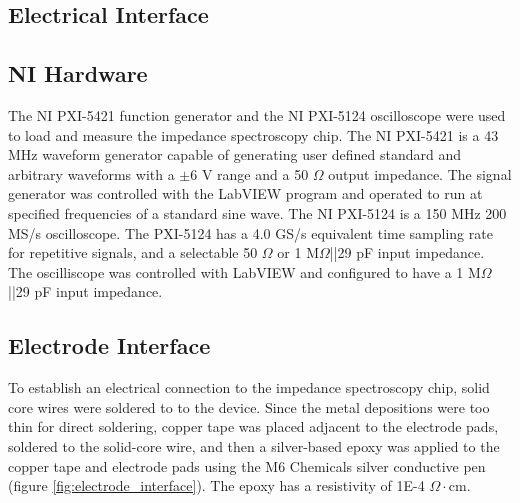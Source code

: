 \subsection{Electrical Interface}

\subsection*{NI Hardware}
\par The NI PXI-5421 function generator and the NI PXI-5124 oscilloscope were used to load and measure the impedance spectroscopy chip. The NI PXI-5421 is a 43 MHz waveform generator capable of generating user defined standard and arbitrary waveforms with a $\pm$6 V range and a 50 $\Omega$ output impedance. The signal generator was controlled with the LabVIEW program and operated to run at specified frequencies of a standard sine wave. The NI PXI-5124 is a 150 MHz 200 MS/s oscilloscope. The PXI-5124 has a 4.0 GS/s equivalent time sampling rate for repetitive signals, and a selectable 50 $\Omega$ or 1 M$\Omega$||29 pF input impedance. The oscilliscope was controlled with LabVIEW and configured to have a 1 M$\Omega$||29 pF input impedance.

\subsection*{Electrode Interface}
\par To establish an electrical connection to the impedance spectroscopy chip, solid core wires were soldered to to the device. Since the metal depositions were too thin for direct soldering, copper tape was placed adjacent to the electrode pads, soldered to the solid-core wire, and then a silver-based epoxy was applied to the copper tape and electrode pads using the M6 Chemicals silver conductive pen (figure \ref{fig:electrode_interface}). The epoxy has a resistivity of 1E-4 $\Omega\cdot$cm.

